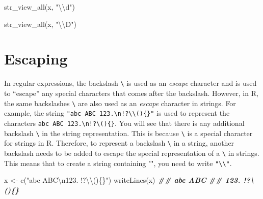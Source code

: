 \documentclass[
]{book}
\newenvironment{Shaded}{\begin{snugshade}}{\end{snugshade}}
\newcommand{\DocumentationTok}[1]{\textcolor[rgb]{0.56,0.35,0.01}{\textbf{\textit{#1}}}}
\newcommand{\FunctionTok}[1]{\textcolor[rgb]{0.00,0.00,0.00}{#1}}
\newcommand{\NormalTok}[1]{#1}
\newcommand{\OtherTok}[1]{\textcolor[rgb]{0.56,0.35,0.01}{#1}}
\newcommand{\SpecialCharTok}[1]{\textcolor[rgb]{0.00,0.00,0.00}{#1}}
\newcommand{\StringTok}[1]{\textcolor[rgb]{0.31,0.60,0.02}{#1}}
\begin{document}
\begin{Shaded}
\begin{Highlighting}[]
\FunctionTok{str\_view\_all}\NormalTok{(x, }\StringTok{"}\SpecialCharTok{\textbackslash{}\textbackslash{}}\StringTok{d"}\NormalTok{)}
\end{Highlighting}
\end{Shaded}

\begin{Shaded}
\begin{Highlighting}[]
\FunctionTok{str\_view\_all}\NormalTok{(x, }\StringTok{"}\SpecialCharTok{\textbackslash{}\textbackslash{}}\StringTok{D"}\NormalTok{)}
\end{Highlighting}
\end{Shaded}

\hypertarget{regex-escape}{%
\section{Escaping}\label{regex-escape}}

In regular expressions, the backslash \texttt{\textbackslash{}} is used as an \emph{escape} character and is used to ``escape'' any special characters that comes after the backslash. However, in R, the same backslashes \texttt{\textbackslash{}} are also used as an \emph{escape} character in strings. For example, the string \texttt{"abc\ ABC\ 123.\textbackslash{}n!?\textbackslash{}\textbackslash{}()\{\}"} is used to represent the characters \texttt{abc\ ABC\ 123.\textbackslash{}n!?\textbackslash{}()\{\}}. You will see that there is any additional backslash \texttt{\textbackslash{}} in the string representation. This is because \texttt{\textbackslash{}} is a special character for strings in R. Therefore, to represent a backslash \texttt{\textbackslash{}} in a string, another backslash needs to be added to escape the special representation of a \texttt{\textbackslash{}} in strings. This means that to create a string containing "", you need to write \texttt{"\textbackslash{}\textbackslash{}"}.

\begin{Shaded}
\begin{Highlighting}[]
\NormalTok{x }\OtherTok{\textless{}{-}} \FunctionTok{c}\NormalTok{(}\StringTok{"abc ABC}\SpecialCharTok{\textbackslash{}n}\StringTok{123. !?}\SpecialCharTok{\textbackslash{}\textbackslash{}}\StringTok{()\{\}"}\NormalTok{)}
\FunctionTok{writeLines}\NormalTok{(x)}
\DocumentationTok{\#\# abc ABC}
\DocumentationTok{\#\# 123. !?\textbackslash{}()\{\}}
\end{Highlighting}
\end{Shaded}
\end{document}
